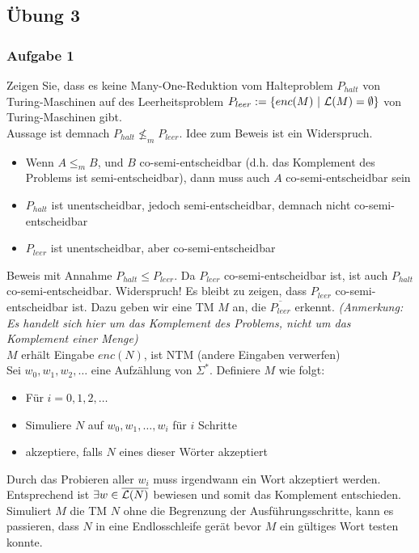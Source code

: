 \subsection*{Übung 3}
\subsubsection*{Aufgabe 1}
    Zeigen Sie, dass es keine Many-One-Reduktion vom Halteproblem $P_{halt}$ von Turing-Maschinen auf des Leerheitsproblem $P_{leer} := \{enc(M)\ |\ \mathcal{L}(M) = \emptyset\}$ von Turing-Maschinen gibt. \\

    \LOES Aussage ist demnach $P_{halt} \not\leq_{m} P_{leer}$. Idee zum Beweis ist ein Widerspruch.
    \begin{itemize}
        \item Wenn $A \leq_{m} B$, und $B$ co-semi-entscheidbar (d.h. das Komplement des Problems ist semi-entscheidbar), dann muss auch $A$ co-semi-entscheidbar sein
        \item $P_{halt}$ ist unentscheidbar, jedoch semi-entscheidbar, demnach nicht co-semi-entscheidbar
        \item $P_{leer}$ ist unentscheidbar, aber co-semi-entscheidbar
    \end{itemize}
    Beweis mit Annahme $P_{halt} \leq P_{leer}$. Da $P_{leer}$ co-semi-entscheidbar ist, ist auch $P_{halt}$ co-semi-entscheidbar. Widerspruch!
    Es bleibt zu zeigen, dass $P_{leer}$ co-semi-entscheidbar ist. Dazu geben wir eine TM $M$ an, die $\overline{P_{leer}}$ erkennt. \textit{(Anmerkung: Es handelt sich hier um das Komplement des Problems, nicht um das Komplement einer Menge)} \\

    $M$ erhält Eingabe $enc(N)$, ist NTM (andere Eingaben verwerfen) \\
    Sei $w_{0}, w_{1}, w_{2}, \dots$ eine Aufzählung von $\Sigma^{*}$. Definiere $M$ wie folgt:
    \begin{itemize}
        \item Für $i = 0, 1, 2, \dots${}
        \item Simuliere $N$ auf $w_{0}, w_{1}, \dots, w_{i}$ für $i$ Schritte
        \item akzeptiere, falls $N$ eines dieser Wörter akzeptiert
    \end{itemize}
    Durch das Probieren aller $w_{i}$ muss irgendwann ein Wort akzeptiert werden. Entsprechend ist $\exists w \in \overline{\mathcal{L}(N)}$ bewiesen und somit das Komplement entschieden. \\
    Simuliert $M$ die TM $N$ ohne die Begrenzung der Ausführungsschritte, kann es passieren, dass $N$ in eine Endlosschleife gerät bevor $M$ ein gültiges Wort testen konnte.


